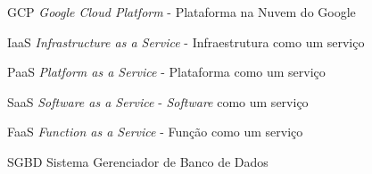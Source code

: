 \begin{siglas}
	\item[GCP]{\emph{Google Cloud Platform} - Plataforma na Nuvem do Google}
	\item[IaaS]{\emph{Infrastructure as a Service} - Infraestrutura como um serviço}
	\item[PaaS]{\emph{Platform as a Service} - Plataforma como um serviço}
	\item[SaaS]{\emph{Software as a Service} - \emph{Software} como um serviço}
	\item[FaaS]{\emph{Function as a Service} - Função como um serviço}
	\item[SGBD]{Sistema Gerenciador de Banco de Dados}
\end{siglas}